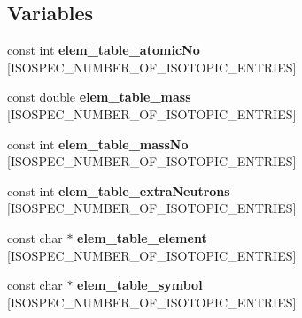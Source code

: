 \subsection*{Variables}
\begin{DoxyCompactItemize}
\item 
\mbox{\label{namespace_iso_spec_ad8f480cc82f6a8972cf586464d61b328}} 
const int {\bfseries elem\+\_\+table\+\_\+atomic\+No} \mbox{[}I\+S\+O\+S\+P\+E\+C\+\_\+\+N\+U\+M\+B\+E\+R\+\_\+\+O\+F\+\_\+\+I\+S\+O\+T\+O\+P\+I\+C\+\_\+\+E\+N\+T\+R\+I\+ES\mbox{]}
\item 
\mbox{\label{namespace_iso_spec_a005cf652f6fd989d4c361ec5a78c3d30}} 
const double {\bfseries elem\+\_\+table\+\_\+mass} \mbox{[}I\+S\+O\+S\+P\+E\+C\+\_\+\+N\+U\+M\+B\+E\+R\+\_\+\+O\+F\+\_\+\+I\+S\+O\+T\+O\+P\+I\+C\+\_\+\+E\+N\+T\+R\+I\+ES\mbox{]}
\item 
\mbox{\label{namespace_iso_spec_a967fbb44ff2abf87af634d2342faff44}} 
const int {\bfseries elem\+\_\+table\+\_\+mass\+No} \mbox{[}I\+S\+O\+S\+P\+E\+C\+\_\+\+N\+U\+M\+B\+E\+R\+\_\+\+O\+F\+\_\+\+I\+S\+O\+T\+O\+P\+I\+C\+\_\+\+E\+N\+T\+R\+I\+ES\mbox{]}
\item 
\mbox{\label{namespace_iso_spec_a933aad6dfcdc5a011338a53dd3699a6d}} 
const int {\bfseries elem\+\_\+table\+\_\+extra\+Neutrons} \mbox{[}I\+S\+O\+S\+P\+E\+C\+\_\+\+N\+U\+M\+B\+E\+R\+\_\+\+O\+F\+\_\+\+I\+S\+O\+T\+O\+P\+I\+C\+\_\+\+E\+N\+T\+R\+I\+ES\mbox{]}
\item 
\mbox{\label{namespace_iso_spec_a0fbc31be6f3b2728456a9a7345f727e8}} 
const char $\ast$ {\bfseries elem\+\_\+table\+\_\+element} \mbox{[}I\+S\+O\+S\+P\+E\+C\+\_\+\+N\+U\+M\+B\+E\+R\+\_\+\+O\+F\+\_\+\+I\+S\+O\+T\+O\+P\+I\+C\+\_\+\+E\+N\+T\+R\+I\+ES\mbox{]}
\item 
\mbox{\label{namespace_iso_spec_a917b6e971fd81932bb4703644ede9728}} 
const char $\ast$ {\bfseries elem\+\_\+table\+\_\+symbol} \mbox{[}I\+S\+O\+S\+P\+E\+C\+\_\+\+N\+U\+M\+B\+E\+R\+\_\+\+O\+F\+\_\+\+I\+S\+O\+T\+O\+P\+I\+C\+\_\+\+E\+N\+T\+R\+I\+ES\mbox{]}
\item 
\mbox{\label{namespace_iso_spec_aaa9917bfb60e80f214b7c6d238a39082}} 

\end{DoxyCompactItemize}
